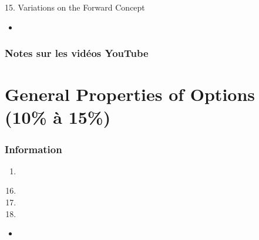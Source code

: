 \documentclass[12pt, titlepage, french]{report}
\begin{document}
\begin{CHPT_SUMM_AUTO}[label = {L.-15}]{15. Variations on the Forward Concept}
	\begin{itemize}
		\item	
	\end{itemize}
\end{CHPT_SUMM_AUTO}

\subsection{Notes sur les vidéos YouTube}


\newpage

\chapter[General Properties of Options]{General Properties of Options (10\% à 15\%)}

\subsection{Information}

\begin{distributions}[Objective]

\end{distributions}

\begin{outcomes}
\begin{enumerate}
	\item	
\end{enumerate}
\end{outcomes}

\begin{ASM_chapter}
\begin{enumerate}
  \setcounter{enumi}{15}
	\item	{}
	\item	{}
	\item	{}
\end{enumerate}
\end{ASM_chapter}

\begin{YTB_vids}
\begin{itemize}
	\item	
\end{itemize}
\end{YTB_vids}
\end{document}
